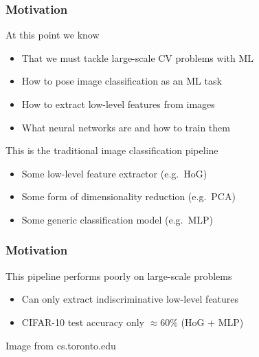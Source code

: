 \documentclass[xetex,professionalfont]{beamer}
\renewcommand\emph[1]{\textcolor{tuwcvl_cvl_blue}{#1}}
\begin{document}
\begin{frame}
\frametitle{Motivation}

At this point we know
\begin{itemize}
    \item That we must tackle large-scale CV problems with ML
    \item How to pose image classification as an ML task
    \item How to extract low-level features from images
    \item What neural networks are and how to train them
\end{itemize}

\bigskip

This is the \emph{traditional image classification pipeline}
\begin{itemize}
    \item Some low-level feature extractor (e.g.~HoG)
    \item Some form of dimensionality reduction (e.g.~PCA)
    \item Some generic classification model (e.g.~MLP)
\end{itemize}

\end{frame}


\begin{frame}
\frametitle{Motivation}

This pipeline performs poorly on large-scale problems
\begin{itemize}
    \item Can only extract indiscriminative low-level features
    \item CIFAR-10 test accuracy only $\approx 60\%$ (HoG + MLP)
\end{itemize}

\bigskip

\begin{center}
    {\centering Image from cs.toronto.edu}
\end{center}

\end{frame}
\end{document}
